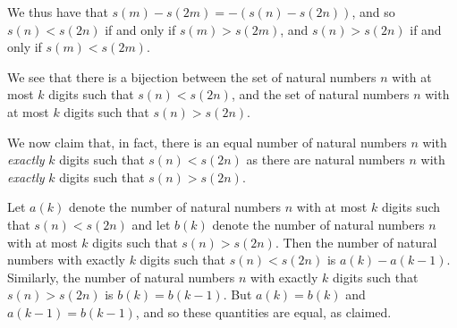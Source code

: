 \documentclass[12pt]{article}
\begin{document}
\begin{enumerate}
We thus have that $s(m) - s(2m) = -(s(n) - s(2n))$, and so $s(n) < s(2n)$ if and
only if $s(m) > s(2m)$, and $s(n) > s(2n)$ if and only if $s(m) < s(2m)$.

We see that there is a bijection between the set of natural numbers $n$ with at
most $k$ digits such that $s(n) < s(2n)$, and the set of natural numbers $n$
with at most $k$ digits such that $s(n) > s(2n)$.

We now claim that, in fact, there is an equal number of natural numbers $n$ with
\emph{exactly} $k$ digits such that $s(n) < s(2n)$ as there are natural numbers
$n$ with \emph{exactly} $k$ digits such that $s(n) > s(2n)$.

Let $a(k)$ denote the number of natural numbers $n$ with at most $k$ digits such
that $s(n) < s(2n)$ and let $b(k)$ denote the number of natural numbers $n$ with
at most $k$ digits such that $s(n) > s(2n)$. Then the number of natural numbers
with exactly $k$ digits such that $s(n) < s(2n)$ is $a(k) - a(k-1)$. Similarly,
the number of natural numbers $n$ with exactly $k$ digits such that $s(n) >
s(2n)$ is $b(k) = b(k - 1)$. But $a(k) = b(k)$ and $a(k - 1) = b(k - 1)$, and so
these quantities are equal, as claimed.

\end{enumerate}

\vfill

\centering
\begin{BVerbatim}
\end{BVerbatim}
\end{document}
